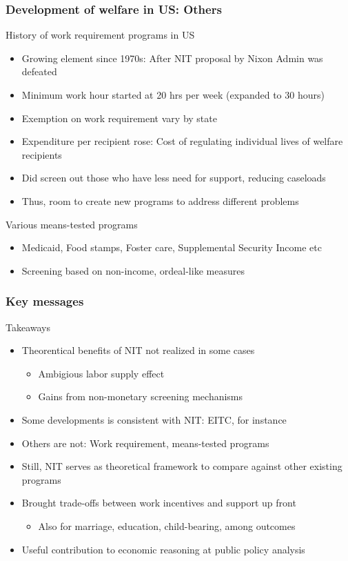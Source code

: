 \documentclass[aspectratio=169]{beamer}
\begin{document}
\begin{frame}
\frametitle{Development of welfare in US: Others} 
History of work requirement programs in US
\begin{itemize}\setlength\itemsep{3pt}
\item Growing element since 1970s: After NIT proposal by Nixon Admin was defeated
\item Minimum work hour started at 20 hrs per week (expanded to 30 hours)
\item Exemption on work requirement vary by state
\item Expenditure per recipient rose: Cost of regulating individual lives of welfare recipients
\item Did screen out those who have less need for support, reducing caseloads
\item Thus, room to create new programs to address different problems
\end{itemize}\medskip
Various means-tested programs
\begin{itemize}\setlength\itemsep{3pt}
\item Medicaid, Food stamps, Foster care, Supplemental Security Income etc
\item Screening based on non-income, ordeal-like measures
\end{itemize}
\end{frame}



\begin{frame}
\frametitle{Key messages} 
 
Takeaways
\begin{itemize}\setlength\itemsep{3pt}
\item Theorentical benefits of NIT not realized in some cases
\begin{itemize}\setlength\itemsep{3pt}
\item Ambigious labor supply effect
\item Gains from non-monetary screening mechanisms
\end{itemize}
\item Some developments is consistent with NIT: EITC, for instance
\item Others are not: Work requirement, means-tested programs
\item Still, NIT serves as theoretical framework to compare against other existing programs
\item Brought trade-offs between work incentives and support up front
\begin{itemize}\setlength\itemsep{3pt}
\item Also for marriage, education, child-bearing, among outcomes
\end{itemize}
\item Useful contribution to economic reasoning at public policy analysis
\end{itemize}\medskip
\end{frame}
\end{document}
